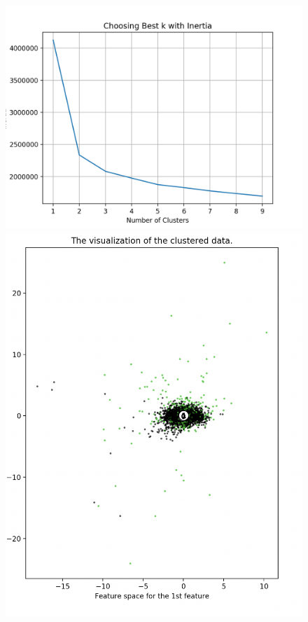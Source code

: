 \documentclass[a4paper,12pt]{article}
\begin{document}
\begin{figure}[!htb]
   \begin{minipage}{0.33\textwidth}
     \centering
     \includegraphics[width=.95\linewidth]{kmeans_inertia_2}
   \end{minipage}\hfill
    \begin{minipage}{0.33\textwidth}
     \centering
     \includegraphics[width=.95\linewidth]{kmeans_sil_21}

\end{minipage}
\end{figure}
\end{document}
